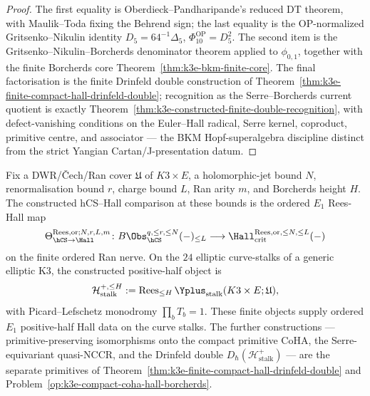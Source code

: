 \begin{proof}
The first equality is Oberdieck--Pandharipande's reduced DT theorem,
with Maulik--Toda fixing the Behrend sign; the last equality is the
OP-normalized Gritsenko--Nikulin identity
\(D_5=64^{-1}\Delta_5\), \(\Phi_{10}^{\mathrm{OP}}=D_5^2\). The
second item is the Gritsenko--Nikulin--Borcherds denominator theorem
applied to $\phi_{0,1}$, together with the finite Borcherds core
Theorem~\ref{thm:k3e-bkm-finite-core}. The final factorisation is the
finite Drinfeld double construction of
Theorem~\ref{thm:k3e-finite-compact-hall-drinfeld-double};
recognition as the Serre--Borcherds current quotient is exactly
Theorem~\ref{thm:k3e-constructed-finite-double-recognition}, with
defect-vanishing conditions on the Euler--Hall radical, Serre kernel,
coproduct, primitive centre, and associator — the BKM Hopf-superalgebra
discipline distinct from the strict Yangian Cartan/J-presentation
datum.
\end{proof}

\begin{proposition}
\label{prop:k3e-finite-dwr-ran-positive-half-surface}
Fix a DWR/\v{C}ech/Ran cover \(\mathfrak U\) of \(K3\times E\), a
holomorphic-jet bound \(N\), renormalisation bound \(r\), charge bound
\(L\), Ran arity \(m\), and Borcherds height \(H\). The constructed
hCS--Hall comparison at these bounds is the ordered \(E_1\) Rees-Hall
map
\[
 \Theta_{\hCS\to\Hall}^{\mathrm{Rees},\mathrm{or};N,r,L,m}\colon
 B\Obs_{\hCS}^{q,\le r,\le N}(-)_{\le L}
 \longrightarrow
 \Hall_{\mathrm{crit}}^{\mathrm{Rees},\mathrm{or},\le N,\le L}(-)
\]
on the finite ordered Ran nerve. On the \(24\) elliptic curve-stalks
of a generic elliptic K3, the constructed positive-half object is
\[
 \mathcal H_{\mathrm{stalk}}^{+,\le H}
 :=
 \operatorname{Rees}_{\le H}
 \Yplus_{\mathrm{stalk}}(K3\times E;\mathfrak U),
\]
with Picard--Lefschetz monodromy \(\prod_bT_b=1\). These finite
objects supply ordered $E_1$ positive-half Hall data on the curve
stalks. The further constructions — primitive-preserving isomorphisms
onto the compact primitive CoHA, the Serre-equivariant quasi-NCCR, and
the Drinfeld double $D_\hbar(\mathcal H_{\mathrm{stalk}}^+)$ — are the
separate primitives of
Theorem~\ref{thm:k3e-finite-compact-hall-drinfeld-double} and
Problem~\ref{op:k3e-compact-coha-hall-borcherds}.
\end{proposition}

